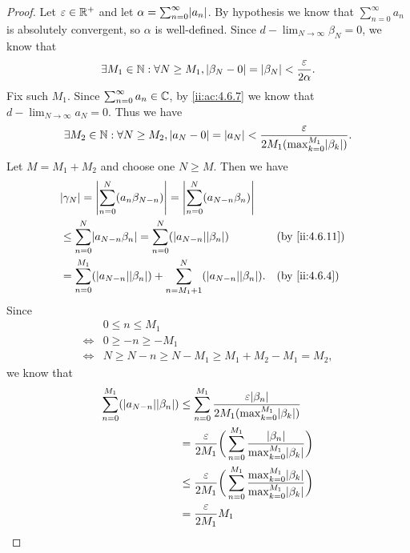 \begin{proof}
  Let \(\varepsilon \in \mathbb{R}^+\) and let \(\alpha = \sum_{n = 0}^\infty \abs{a_n}\).
  By hypothesis we know that \(\sum_{n = 0}^\infty a_n\) is absolutely convergent, so \(\alpha\) is well-defined.
  Since \(d - \lim_{N \to \infty} \beta_N = 0\), we know that
  \[
    \exists M_1 \in \mathbb{N} : \forall N \geq M_1, \left\lvert\beta_N - 0\right\rvert = \left\lvert\beta_N\right\rvert < \dfrac{\varepsilon}{2 \alpha}.
  \]
  Fix such \(M_1\).
  Since \(\sum_{n = 0}^\infty a_n \in \mathbb{C}\), by \cref{ii:ac:4.6.7} we know that \(d - \lim_{N \to \infty} a_N = 0\).
  Thus we have
  \[
    \exists M_2 \in \N : \forall N \geq M_2, \abs{a_N - 0} = \abs{a_N} < \dfrac{\varepsilon}{2 M_1 (\max_{k = 0}^{M_1} \abs{\beta_k})}.
  \]
  Let \(M = M_1 + M_2\) and choose one \(N \geq M\).
  Then we have
  \begin{align*}
     & \abs{\gamma_N} = \abs{\sum_{n = 0}^N (a_n \beta_{N - n})} = \abs{\sum_{n = 0}^N (a_{N - n} \beta_n)}                             \\
     & \leq \sum_{n = 0}^N \abs{a_{N - n} \beta_n} = \sum_{n = 0}^N (\abs{a_{N - n}} \abs{\beta_n})                 &  & \by{ii:4.6.11} \\
     & = \sum_{n = 0}^{M_1} (\abs{a_{N - n}} \abs{\beta_n}) + \sum_{n = M_1 + 1}^N (\abs{a_{N - n}} \abs{\beta_n}). &  & \by{ii:4.6.4}
  \end{align*}
  Since
  \begin{align*}
         & 0 \leq n \leq M_1                                     \\
    \iff & 0 \geq -n \geq -M_1                                   \\
    \iff & N \geq N - n \geq N - M_1 \geq M_1 + M_2 - M_1 = M_2,
  \end{align*}
  we know that
  \begin{align*}
    \sum_{n = 0}^{M_1} (\abs{a_{N - n}} \abs{\beta_n}) & \leq \sum_{n = 0}^{M_1} \dfrac{\varepsilon \abs{\beta_n}}{2 M_1 (\max_{k = 0}^{M_1} \abs{\beta_k})}                                       \\
                                                       & = \dfrac{\varepsilon}{2 M_1} \bigg(\sum_{n = 0}^{M_1} \dfrac{\abs{\beta_n}}{\max_{k = 0}^{M_1} \abs{\beta_k}}\bigg)                       \\
                                                       & \leq \dfrac{\varepsilon}{2 M_1} \bigg(\sum_{n = 0}^{M_1} \dfrac{\max_{k = 0}^{M_1} \abs{\beta_k}}{\max_{k = 0}^{M_1} \abs{\beta_k}}\bigg) \\
                                                       & = \dfrac{\varepsilon}{2 M_1} M_1                                                                                                          \\

\end{align*}
\end{proof}
